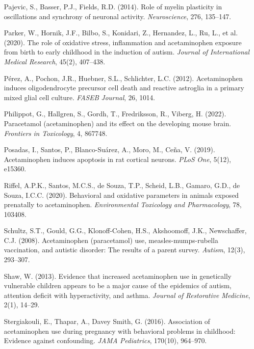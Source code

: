 \documentclass[12pt]{article}
\begin{document}
\begin{thebibliography}{99}
Pajevic, S., Basser, P.J., Fields, R.D. (2014).
Role of myelin plasticity in oscillations and synchrony of neuronal activity.
\textit{Neuroscience}, 276, 135--147.

Parker, W., Hornik, J.F., Bilbo, S., Konidari, Z., Hernandez, L., Ru, L., et al. (2020).
The role of oxidative stress, inflammation and acetaminophen exposure from birth to early childhood in the induction of autism.
\textit{Journal of International Medical Research}, 45(2), 407--438.

Pérez, A., Pochon, J.R., Huebner, S.L., Schlichter, L.C. (2012).
Acetaminophen induces oligodendrocyte precursor cell death and reactive astroglia in a primary mixed glial cell culture.
\textit{FASEB Journal}, 26, 1014.

Philippot, G., Hallgren, S., Gordh, T., Fredriksson, R., Viberg, H. (2022).
Paracetamol (acetaminophen) and its effect on the developing mouse brain.
\textit{Frontiers in Toxicology}, 4, 867748.

Posadas, I., Santos, P., Blanco-Suárez, A., Moro, M., Ceña, V. (2019).
Acetaminophen induces apoptosis in rat cortical neurons.
\textit{PLoS One}, 5(12), e15360.

Riffel, A.P.K., Santos, M.C.S., de Souza, T.P., Scheid, L.B., Gamaro, G.D., de Souza, I.C.C. (2020).
Behavioral and oxidative parameters in animals exposed prenatally to acetaminophen.
\textit{Environmental Toxicology and Pharmacology}, 78, 103408.

Schultz, S.T., Gould, G.G., Klonoff-Cohen, H.S., Akshoomoff, J.K., Newschaffer, C.J. (2008).
Acetaminophen (paracetamol) use, measles-mumps-rubella vaccination, and autistic disorder: The results of a parent survey.
\textit{Autism}, 12(3), 293--307.

Shaw, W. (2013).
Evidence that increased acetaminophen use in genetically vulnerable children appears to be a major cause of the epidemics of autism, attention deficit with hyperactivity, and asthma.
\textit{Journal of Restorative Medicine}, 2(1), 14--29.

Stergiakouli, E., Thapar, A., Davey Smith, G. (2016).
Association of acetaminophen use during pregnancy with behavioral problems in childhood: Evidence against confounding.
\textit{JAMA Pediatrics}, 170(10), 964--970.


\end{thebibliography}
\end{document}
